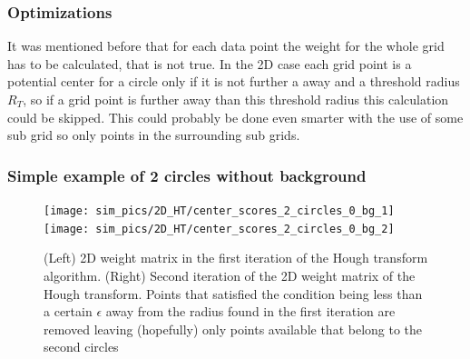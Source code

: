 \documentclass[11pt,twoside]{scrreprt}
\begin{document}
\subsubsection{Optimizations} %
\label{ssub:optimizations}
It was mentioned before that for each data point the weight for the whole grid has to be calculated, that is not true. In the 2D case each grid point is a potential center for a circle only if it is not further a away and a threshold radius $R_T$, so if a grid point is further away than this threshold radius this calculation could be skipped. This could probably be done even smarter with the use of some sub grid so only points in the surrounding sub grids.


\subsubsection{Simple example of 2 circles without background} %
\label{ssub:simple_example_of_2_circles_without_background}
\begin{figure}[hp]
  \centering
  \texttt{[image: sim\_pics/2D\_HT/center\_scores\_2\_circles\_0\_bg\_1]}%
  \texttt{[image: sim\_pics/2D\_HT/center\_scores\_2\_circles\_0\_bg\_2]}

  \caption[2D weight matrix, first iteration]{(Left) 2D weight matrix in the first iteration of the Hough transform algorithm. (Right) Second iteration
  of the 2D weight matrix of the Hough transform. Points that satisfied the condition being less than a certain $\epsilon$ away from the radius found in the first iteration are removed leaving (hopefully) only points available that belong to the second circles}
  \label{fig:2d_weights_01}
\end{figure}
\end{document}
